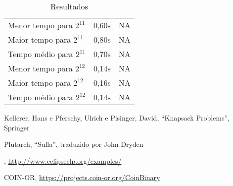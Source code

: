 \documentclass{article}
\begin{document}
\begin{center}
\begin{table}
\begin{tabular}{| l | c | c |}
      Menor tempo para $2^{11}$ & 0,60s & NA \\ Maior tempo para
      $2^{11}$ & 0,80s & NA \\ Tempo médio para $2^{11}$ & 0,70s & NA
      \\ \hline

      Menor tempo para $2^{12}$ & 0,14s & NA \\ Maior tempo para
      $2^{12}$ & 0,16s & NA \\ Tempo médio para $2^{12}$ & 0,14s & NA
      \\ \hline
    \end{tabular}
    \caption{Resultados}
    \label{tab:rst}
  \end{table}
  \egroup
\end{center}


\begin{thebibliography}{2}

 Kellerer, Hans e Pferschy, Ulrich e Pisinger,
  David, ``Knapsack Problems'', Springer

 Plutarch, ``Sulla'', traduzido por John Dryden

 \eclipse,
  \url{http://www.eclipseclp.org/examples/}

  COIN-OR,
  \url{https://projects.coin-or.org/CoinBinary}
  
\end{thebibliography}
\end{document}
